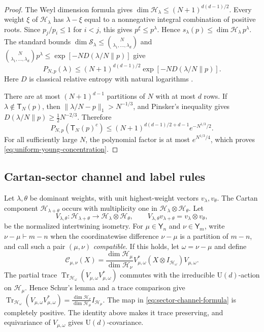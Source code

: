 \documentclass[11pt]{article}
\theoremstyle{remark}
\theoremstyle{plain}
\newcommand{\cC}{\mathcal C}
\newcommand{\cH}{\mathcal H}
\newcommand{\cS}{\mathcal S}
\newcommand{\U}{\mathrm U}
\newcommand{\Tr}{\operatorname{Tr}}
\newcommand{\ot}{\otimes}
\begin{document}
\begin{proof}
The Weyl dimension formula gives
\(\dim\cH_\lambda\le(N+1)^{d(d-1)/2}\).  Every weight \(\xi\) of
\(\cH_\lambda\) has \(\lambda-\xi\) equal to a nonnegative integral
combination of positive roots.  Since \(p_j/p_i\le1\) for \(i<j\), this gives
\(p^\xi\le p^\lambda\).  Hence
\(s_\lambda(p)\le \dim\cH_\lambda\,p^\lambda\).
The standard bounds
\(\dim\cS_\lambda\le\binom{N}{\lambda_1,\ldots,\lambda_d}\) and
\(\binom{N}{\lambda_1,\ldots,\lambda_d}p^\lambda
\le \exp[-ND(\lambda/N\|p)]\) give
\begin{equation}\label{eq:finite-Young-large-deviation}
  P_{N,p}(\lambda)
  \le (N+1)^{d(d-1)/2}\exp[-ND(\lambda/N\|p)].
\end{equation}
Here \(D\) is classical relative entropy with natural logarithms
\cite{KeylWerner2001Spectrum}.

There are at most \((N+1)^{d-1}\) partitions of \(N\) with at most \(d\)
rows.  If \(\lambda\notin\mathsf T_N(p)\), then
\(\|\lambda/N-p\|_1>N^{-1/3}\), and Pinsker's inequality gives
\(D(\lambda/N\|p)\ge\tfrac12N^{-2/3}\).  Therefore
\[
  P_{N,p}(\mathsf T_N(p)^c)
  \le (N+1)^{d(d-1)/2+d-1}e^{-N^{1/3}/2}.
\]
For all sufficiently large \(N\), the polynomial factor is at most
\(e^{N^{1/3}/4}\), which proves \eqref{eq:uniform-young-concentration}.
\end{proof}

\subsection{Cartan-sector channel and label rules}
\label{sec:cartan-sector-lifting}

Let \(\lambda,\theta\) be dominant weights, with unit highest-weight vectors
\(v_\lambda,v_\theta\).  The Cartan component \(\cH_{\lambda+\theta}\)
occurs with multiplicity one in \(\cH_\lambda\ot\cH_\theta\).  Let
\begin{equation}\label{eq:cartan-inclusion}
  V_{\lambda,\theta}:\cH_{\lambda+\theta}
  \longrightarrow\cH_\lambda\ot\cH_\theta,
  \qquad
  V_{\lambda,\theta}v_{\lambda+\theta}=v_\lambda\ot v_\theta,
\end{equation}
be the normalized intertwining isometry.  For \(\mu\in\mathsf Y_n\) and
\(\nu\in\mathsf Y_m\), write \(\nu-\mu\vdash m-n\) when the coordinatewise
difference \(\nu-\mu\) is a partition of \(m-n\), and call such a pair
\((\mu,\nu)\) \emph{compatible}.  If this holds, let
\(\omega=\nu-\mu\) and define
\begin{equation}\label{eq:sector-channel-formula}
  \cC_{\mu,\nu}(X)
  =\frac{\dim\cH_\mu}{\dim\cH_\nu}
  V_{\mu,\omega}^*(X\ot I_{\cH_\omega})V_{\mu,\omega}.
\end{equation}
The partial trace
\(\Tr_{\cH_\omega}(V_{\mu,\omega}V_{\mu,\omega}^*)\) commutes with the
irreducible \(\U(d)\)-action on \(\cH_\mu\).  Hence Schur's lemma and a trace
comparison give
\(
  \Tr_{\cH_\omega}(V_{\mu,\omega}V_{\mu,\omega}^*)
  =\frac{\dim\cH_\nu}{\dim\cH_\mu}I_{\cH_\mu}
\).
The map in \eqref{eq:sector-channel-formula} is completely positive.
The identity above makes it trace preserving, and equivariance of
\(V_{\mu,\omega}\) gives \(\U(d)\)-covariance.
\end{document}
